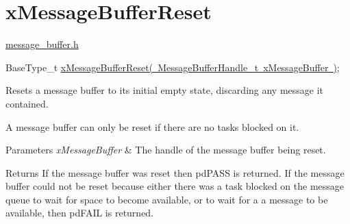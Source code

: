\hypertarget{group__x_message_buffer_reset}{}\section{x\+Message\+Buffer\+Reset}
\label{group__x_message_buffer_reset}
\mbox{\hyperlink{message__buffer_8h}{message\+\_\+buffer.\+h}} 
\begin{DoxyPre}
BaseType\_t \mbox{\hyperlink{message__buffer_8h_a6d22ac0fd0463b202f2e22674380a41c}{xMessageBufferReset( MessageBufferHandle\_t xMessageBuffer )}};
\end{DoxyPre}


Resets a message buffer to its initial empty state, discarding any message it contained.

A message buffer can only be reset if there are no tasks blocked on it.


\begin{DoxyParams}{Parameters}
{\em x\+Message\+Buffer} & The handle of the message buffer being reset.\\
\hline
\end{DoxyParams}
\begin{DoxyReturn}{Returns}
If the message buffer was reset then pd\+P\+A\+SS is returned. If the message buffer could not be reset because either there was a task blocked on the message queue to wait for space to become available, or to wait for a a message to be available, then pd\+F\+A\+IL is returned. 
\end{DoxyReturn}
